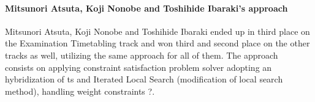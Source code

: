 


\paragraph{Mitsunori Atsuta, Koji Nonobe and Toshihide Ibaraki's approach}
Mitsunori Atsuta, Koji Nonobe and Toshihide Ibaraki ended up in third place on the Examination Timetabling track and won third and second place on the other tracks as well, utilizing the same approach for all of them. The approach~\cite{Ibaraki2007} consists on applying constraint satisfaction problem solver adopting an hybridization of \gls{ts} and Iterated Local Search (modification of local search method), handling weight constraints {\color{red} ?}.\\

